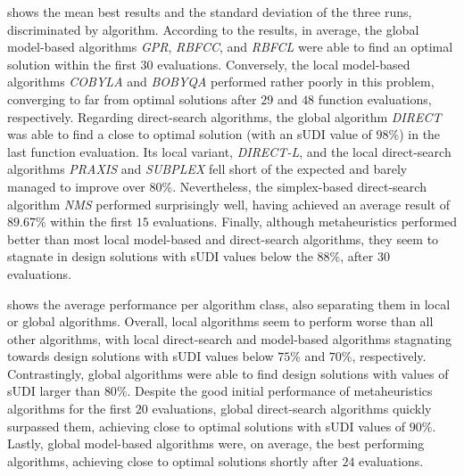  shows the mean best results and the standard deviation of the three runs, discriminated by algorithm. According to the results, in average, the global model-based algorithms \textit{\ac{GPR}}, \textit{\ac{RBF}CC}, and \textit{\ac{RBF}CL} were able to find an optimal solution within the first $30$ evaluations. Conversely, the local model-based algorithms \textit{\ac{COBYLA}} and \textit{\ac{BOBYQA}} performed rather poorly in this problem, converging to far from optimal solutions after $29$ and $48$ function evaluations, respectively. Regarding direct-search algorithms, the global algorithm \textit{\ac{DIRECT}} was able to find a close to optimal solution (with an \ac{sUDI} value of $98\%$) in the last function evaluation. Its local variant, \textit{\ac{DIRECT}-L}, and the local direct-search algorithms \textit{\ac{PRAXIS}} and \textit{SUBPLEX} fell short of the expected and barely managed to improve over $80\%$. Nevertheless, the simplex-based direct-search algorithm \textit{\ac{NMS}} performed surprisingly well, having achieved an average result of $89.67\%$ within the first $15$ evaluations. Finally, although metaheuristics performed better than most local model-based and direct-search algorithms, they seem to stagnate in design solutions with \ac{sUDI} values below the $88\%$, after $30$ evaluations.

 shows the average performance per algorithm class, also separating them in local or global algorithms. Overall, local algorithms seem to perform worse than all other algorithms, with local direct-search and model-based algorithms stagnating towards design solutions with \ac{sUDI} values below $75\%$ and $70\%$, respectively. Contrastingly, global algorithms were able to find design solutions with values of \ac{sUDI} larger than $80\%$. Despite the good initial performance of metaheuristics algorithms for the first $20$ evaluations, global direct-search algorithms quickly surpassed them, achieving close to optimal solutions with \ac{sUDI} values of $90\%$. Lastly, global model-based algorithms were, on average, the best performing algorithms, achieving close to optimal solutions shortly after $24$ evaluations. 


